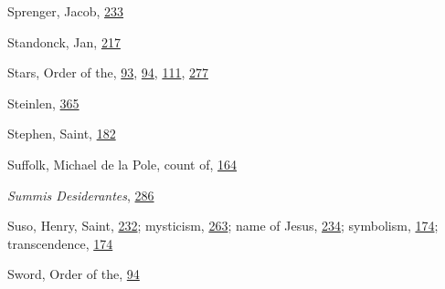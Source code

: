 Sprenger, Jacob,
\protect\hyperlink{15_Chapter_Eight__RELIGIOUS_EXCITAT.xhtmlux5cux23page_233}{233}

Standonck, Jan,
\protect\hyperlink{14_Chapter_Seven__THE_PIOUS_PERSONA.xhtmlux5cux23page_217}{217}

Stars, Order of the,
\protect\hyperlink{10_Chapter_Three__THE_HEROIC_DREAM.xhtmlux5cux23page_93}{93},
\protect\hyperlink{10_Chapter_Three__THE_HEROIC_DREAM.xhtmlux5cux23page_94}{94},
\protect\hyperlink{10_Chapter_Three__THE_HEROIC_DREAM.xhtmlux5cux23page_111}{111},
\protect\hyperlink{18_Chapter_Eleven__THE_FORMS_OF_THO.xhtmlux5cux23page_277}{277}

Steinlen,
\protect\hyperlink{21_Chapter_Thirteen__IMAGE_AND_WORD.xhtmlux5cux23page_365}{365}

Stephen, Saint,
\protect\hyperlink{13_Chapter_Six__THE_DEPICTION_OF_TH.xhtmlux5cux23page_182}{182}

Suffolk, Michael de la Pole, count of,
\protect\hyperlink{12_Chapter_Five__THE_VISION_OF_DEAT.xhtmlux5cux23page_164}{164}

\emph{Summis Desiderantes},
\protect\hyperlink{18_Chapter_Eleven__THE_FORMS_OF_THO.xhtmlux5cux23page_286}{286}

Suso, Henry, Saint,
\protect\hyperlink{15_Chapter_Eight__RELIGIOUS_EXCITAT.xhtmlux5cux23page_232}{232};
mysticism,
\protect\hyperlink{17_Chapter_Ten__THE_FAILURE_OF_IMAG.xhtmlux5cux23page_263}{263};
name of Jesus,
\protect\hyperlink{16_Chapter_Nine__THE_DECLINE_OF_SYM.xhtmlux5cux23page_234}{234};
symbolism,
\protect\hyperlink{13_Chapter_Six__THE_DEPICTION_OF_TH.xhtmlux5cux23page_174}{174};
transcendence,
\protect\hyperlink{13_Chapter_Six__THE_DEPICTION_OF_TH.xhtmlux5cux23page_174}{174}

Sword, Order of the,
\protect\hyperlink{10_Chapter_Three__THE_HEROIC_DREAM.xhtmlux5cux23page_94}{94}

